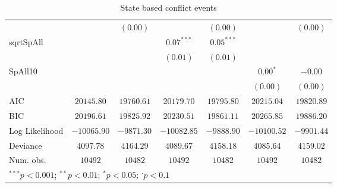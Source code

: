 \begin{sidewaystable}
\begin{center}
{\begin{tabular}{l c c c c c c}
                &               & $(0.00)$      &               & $(0.00)$      &               & $(0.00)$      \\
sqrtSpAll       &               &               & $0.07^{***}$  & $0.05^{***}$  &               &               \\
                &               &               & $(0.01)$      & $(0.01)$      &               &               \\
SpAll10         &               &               &               &               & $0.00^{*}$    & $-0.00$       \\
                &               &               &               &               & $(0.00)$      & $(0.00)$      \\
\hline
AIC             & $20145.80$    & $19760.61$    & $20179.70$    & $19795.80$    & $20215.04$    & $19820.89$    \\
BIC             & $20196.61$    & $19825.92$    & $20230.51$    & $19861.11$    & $20265.85$    & $19886.20$    \\
Log Likelihood  & $-10065.90$   & $-9871.30$    & $-10082.85$   & $-9888.90$    & $-10100.52$   & $-9901.44$    \\
Deviance        & $4097.78$     & $4164.29$     & $4089.67$     & $4158.18$     & $4085.64$     & $4159.02$     \\
Num. obs.       & $10492$       & $10482$       & $10492$       & $10482$       & $10492$       & $10482$       \\
\hline
\multicolumn{7}{l}{\scriptsize{$^{***}p<0.001$; $^{**}p<0.01$; $^{*}p<0.05$; $^{\cdot}p<0.1$}}
\end{tabular}
}
\caption{State based conflict events}
\label{state_based}
\end{center}
\end{sidewaystable}
